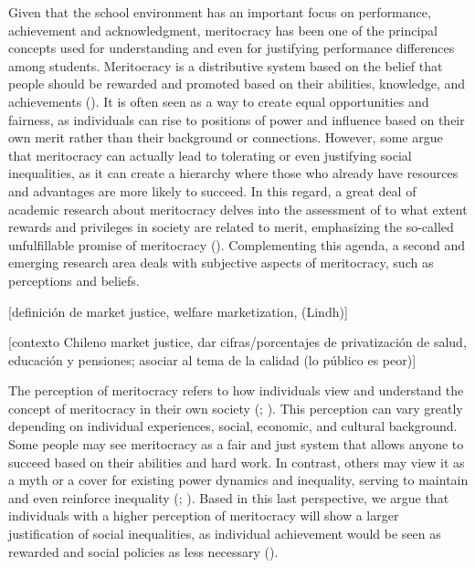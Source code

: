 \documentclass[
  letterpaper,
  DIV=11,
  numbers=noendperiod]{scrartcl}
\begin{document}
Given that the school environment has an important focus on performance,
achievement and acknowledgment, meritocracy has been one of the
principal concepts used for understanding and even for justifying
performance differences among students. Meritocracy is a distributive
system based on the belief that people should be rewarded and promoted
based on their abilities, knowledge, and achievements
(). It is often seen as a way
to create equal opportunities and fairness, as individuals can rise to
positions of power and influence based on their own merit rather than
their background or connections. However, some argue that meritocracy
can actually lead to tolerating or even justifying social inequalities,
as it can create a hierarchy where those who already have resources and
advantages are more likely to succeed. In this regard, a great deal of
academic research about meritocracy delves into the assessment of to
what extent rewards and privileges in society are related to merit,
emphasizing the so-called unfulfillable promise of meritocracy
(). Complementing this
agenda, a second and emerging research area deals with subjective
aspects of meritocracy, such as perceptions and beliefs.~

{[}definición de market justice, welfare marketization, (Lindh){]}

{[}contexto Chileno market justice, dar cifras/porcentajes de
privatización de salud, educación y pensiones; asociar al tema de la
calidad (lo público es peor){]}

The perception of meritocracy refers to how individuals view and
understand the concept of meritocracy in their own society
(;
). This perception can vary greatly depending on individual
experiences, social, economic, and cultural background. Some people may
see meritocracy as a fair and just system that allows anyone to succeed
based on their abilities and hard work. In contrast, others may view it
as a myth or a cover for existing power dynamics and inequality, serving
to maintain and even reinforce inequality
(;
). Based in this
last perspective, we argue that individuals with a higher perception of
meritocracy will show a larger justification of social inequalities, as
individual achievement would be seen as rewarded and social policies as
less necessary ().
\end{document}

